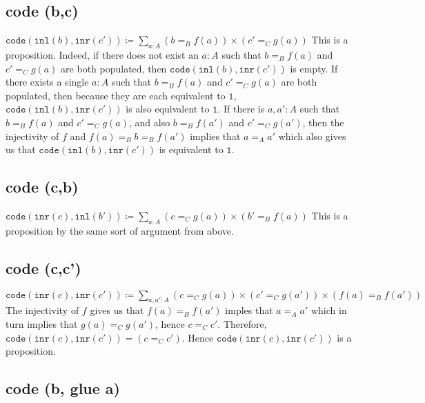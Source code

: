 \message{ !name(notes.tex)}\documentclass[12pt]{amsart}
\newcommand{\type}[1]{\mathtt{#1}}
\newcommand{\inl}{\type{inl}}
\newcommand{\inr}{\type{inr}}
\theoremstyle{remark}
\theoremstyle{definition}
\begin{document}
\pagebreak
\subsection*{code (b,c)}

$
	\type{ code } \left( \inl( b ) , \inr( c' ) \right) \coloneqq
	\sum_{ a : A } ( b =_B f ( a ) ) \times ( c' =_C g ( a ) )
$
This is a proposition. 
Indeed, if there does not exist an $ a : A $ such that
$ b =_B f ( a )$ and $ c' =_C g ( a ) $
are both populated, then 
$ \type{ code } \left( \inl( b ) , \inr( c' ) \right) $ 
is empty. 
If there exists a single $a : A$ such that 
$ b =_B f ( a )$ and $ c' =_C g ( a ) $
are both populated, then 
because they are each equivalent to $ \type{ 1 }$,
$ \type{ code } \left( \inl( b ) , \inr( c' ) \right) $ 
is also equivalent to $ \type{ 1 }$.
If there is $a, a' : A$ such that
$ b =_B f ( a )$ and $ c' =_C g ( a ) $,
and also 
$ b =_B f ( a' )$ and $ c' =_C g ( a' ) $,
then the injectivity of $f$ and
$f ( a ) =_B b =_B f ( a' )$ 
implies that
$a =_A a'$
which also gives us that 
$ \type{ code } \left( \inl( b ) , \inr( c' ) \right) $ 
is equivalent to $ \type{ 1 }$.

\pagebreak
\subsection*{code (c,b)}

	$ \type{ code } \left( \inr( c ) , \inl( b' ) \right) \coloneqq \sum_{ a : A } ( c =_C g ( a ) ) \times ( b' =_B f ( a ) ) $
	This is a proposition by the same sort of argument from above.

\pagebreak
\subsection*{code (c,c')}

	$ \type{ code } \left( \inr( c ) , \inr( c' ) \right) \coloneqq \sum_{ a , a' : A } ( c =_C g ( a ) ) \times ( c' =_C g ( a' ) ) \times ( f ( a ) =_B f ( a' ) ) $ 	
	The injectivity of $f$ gives us that 
	$ f ( a ) =_B f ( a' ) $
	imples that 
	$ a =_A a'$
	which in turn implies that
	$ g ( a ) =_C g ( a' )$,
	hence 
	$ c =_C c'$.
	Therefore, 
	$
	\type{ code } \left( \inr( c ) , \inr( c' ) \right) =	
	\left( c =_C c'  \right). 
	$
	Hence 
	$ \type{ code } \left( \inr( c ) , \inr( c' ) \right) $
	is a proposition.

\pagebreak
\subsection*{code (b, glue a)}
\end{document}
